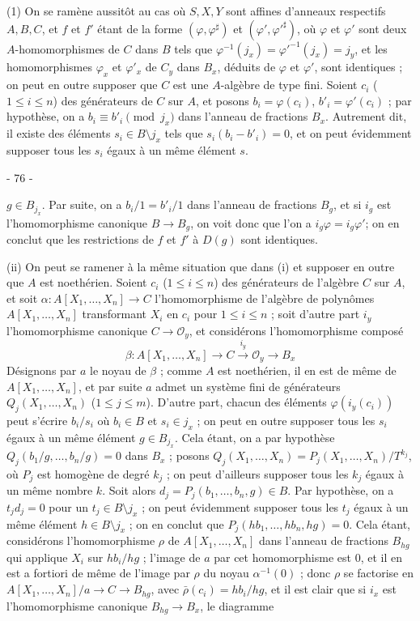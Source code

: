 (1) On se ramène aussitôt au cas où $S, X, Y$ sont affines d'anneaux respectifs $A, B, C$, et $f$ et $f'$ étant de la forme $(\varphi, \varphi^\sharp)$ et $(\varphi', \varphi'^\sharp)$, où $\varphi$ et $\varphi'$ sont deux $A$-homomorphismes de $C$ dans $B$ tels que $\varphi^{-1}(j_x) = \varphi'^{-1}(j_x) = j_y$, et les homomorphismes $\varphi_x$ et $\varphi'_x$ de $C_y$ dans $B_x$, déduits de $\varphi$ et $\varphi'$, sont identiques ; on peut en outre supposer que $C$ est une $A$-algèbre de type fini. Soient $c_i$ ($1 \le i \le n$) des générateurs de $C$ sur $A$, et posons $b_i = \varphi(c_i)$, $b'_i = \varphi'(c_i)$ ; par hypothèse, on a $b_i \equiv b'_i \pmod{j_x}$ dans l'anneau de fractions $B_x$. Autrement dit, il existe des éléments $s_i \in B \setminus j_x$ tels que $s_i(b_i - b'_i) = 0$, et on peut évidemment supposer tous les $s_i$ égaux à un même élément $s$.

\newpage


- 76 -

$g \in B_{j_x}$. Par suite, on a $b_i/1 = b'_i/1$ dans l'anneau de fractions $B_g$, et si $i_g$ est l'homomorphisme canonique $B \to B_g$, on voit donc que l'on a $i_g \varphi = i_g \varphi'$; on en conclut que les restrictions de $f$ et $f'$ à $D(g)$ sont identiques.

(ii) On peut se ramener à la même situation que dans (i) et supposer en outre que $A$ est noethérien. Soient $c_i$ ($1 \le i \le n$) des générateurs de l'algèbre $C$ sur $A$, et soit $\alpha : A[X_1, \dots, X_n] \to C$ l'homomorphisme de l'algèbre de polynômes $A[X_1, \dots, X_n]$ transformant $X_i$ en $c_i$ pour $1 \le i \le n$ ; soit d'autre part $i_y$ l'homomorphisme canonique $C \to \mathcal{O}_y$, et considérons l'homomorphisme composé
$$\beta : A[X_1, \dots, X_n] \to C \xrightarrow{i_y} \mathcal{O}_y \to B_x$$
Désignons par $a$ le noyau de $\beta$ ; comme $A$ est noethérien, il en est de même de $A[X_1, \dots, X_n]$, et par suite $a$ admet un système fini de générateurs $Q_j(X_1, \dots, X_n)$ ($1 \le j \le m$). D'autre part, chacun des éléments $\varphi(i_y(c_i))$ peut s'écrire $b_i/s_i$ où $b_i \in B$ et $s_i \in j_x$ ; on peut en outre supposer tous les $s_i$ égaux à un même élément $g \in B_{j_x}$. Cela étant, on a par hypothèse $Q_j(b_1/g, \dots, b_n/g) = 0$ dans $B_x$ ; posons $Q_j(X_1, \dots, X_n) = P_j(X_1, \dots, X_n) / T^{k_j}$, où $P_j$ est homogène de degré $k_j$ ; on peut d'ailleurs supposer tous les $k_j$ égaux à un même nombre $k$. Soit alors $d_j = P_j(b_1, \dots, b_n, g) \in B$. Par hypothèse, on a $t_j d_j = 0$ pour un $t_j \in B \setminus j_x$ ; on peut évidemment supposer tous les $t_j$ égaux à un même élément $h \in B \setminus j_x$ ; on en conclut que $P_j(hb_1, \dots, hb_n, hg) = 0$. Cela étant, considérons l'homomorphisme $\rho$ de $A[X_1, \dots, X_n]$ dans l'anneau de fractions $B_{hg}$ qui applique $X_i$ sur $hb_i/hg$ ; l'image de $a$ par cet homomorphisme est 0, et il en est a fortiori de même de l'image par $\rho$ du noyau $\alpha^{-1}(0)$ ; donc $\rho$ se factorise en $A[X_1, \dots, X_n] / a \to C \to B_{hg}$, avec $\bar{\rho}(c_i) = hb_i/hg$, et il est clair que si $i_x$ est l'homomorphisme canonique $B_{hg} \to B_x$, le diagramme

